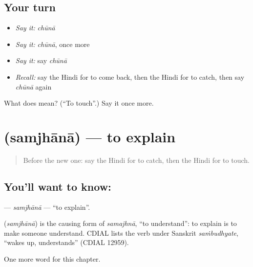 \subsection*{Your turn}
\begin{itemize}
\raggedright
  \item \emph{Say it:} \emph{chūnā}
  \item \emph{Say it:} \emph{chūnā}, once more
  \item \emph{Say it:} say \emph{chūnā}
  \item \emph{Recall:} say the Hindi for to come back, then the Hindi for to catch, then say \emph{chūnā} again
\end{itemize}

\begin{tcolorbox}[breakable,colback=teal!4,colframe=teal!35!black,title={Before you move on}]
What does  mean? (\textquotedblleft{}To touch\textquotedblright{}.) Say it once more.
\end{tcolorbox}
\section[\texorpdfstring{\hi{समझाना} (samjhānā)}{समझाना (samjhānā)}]{ (samjhānā) — to explain}

\label{lesson:HI-C165-samjhana}



\begin{quote}
Before the new one: say the Hindi for to catch, then the Hindi for to touch.
\end{quote}

\subsection*{You'll want to know: }
\textbf{} — \emph{samjhānā} — \textquotedblleft{}to explain\textquotedblright{}.

\begin{cousinweb}
\textbf{} (\emph{samjhānā}) is the causing form of \emph{samajhnā}, \textquotedblleft{}to understand\textquotedblright{}: to explain is to make someone understand. CDIAL lists the verb under Sanskrit \emph{saṁbudhyate}, \textquotedblleft{}wakes up, understands\textquotedblright{} (CDIAL 12959).
\end{cousinweb}

\begin{grammarlens}[title={What you've built}]
One more word for this chapter.
\end{grammarlens}

